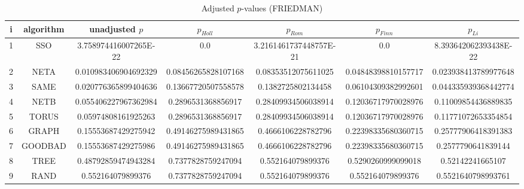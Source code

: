\documentclass[a4paper,10pt]{article}
\begin{document}
\begin{landscape}
\begin{table}[!htp]
\centering\scriptsize
\caption{Adjusted $p$-values (FRIEDMAN)}
\begin{tabular}{ccccccc}
i&algorithm&unadjusted $p$&$p_{Holl}$&$p_{Rom}$&$p_{Finn}$&$p_{Li}$\\
\hline
1& SSO&3.758974416007265E-22&0.0&3.2161461737448757E-21&0.0&8.393642062393438E-22\\
2& NETA&0.010983406904692329&0.08456265828107168&0.08353512075611025&0.04848398810157717&0.023938413789977648\\
3& SAME&0.020776365899404636&0.13667720507558578&0.1382725802134458&0.06104309382992601&0.044335939368442774\\
4& NETB&0.055406227967362984&0.2896531368856917&0.28409934506038914&0.12036717970028976&0.11009854436889835\\
5& TORUS&0.05974808161925263&0.2896531368856917&0.28409934506038914&0.12036717970028976&0.11771072653354854\\
6& GRAPH&0.15553687429275942&0.49146275989431865&0.4666106228782796&0.22398335680360715&0.25777906418391383\\
7& GOODBAD&0.15553687429275986&0.49146275989431865&0.4666106228782796&0.22398335680360715&0.2577790641839144\\
8& TREE&0.48792859474943284&0.7377828759247094&0.552164079899376&0.5290260999099018&0.52142241665107\\
9& RAND&0.552164079899376&0.7377828759247094&0.552164079899376&0.552164079899376&0.5521640798993761\\
\hline
\end{tabular}
\end{table}


\newpage


\end{landscape}
\end{document}
